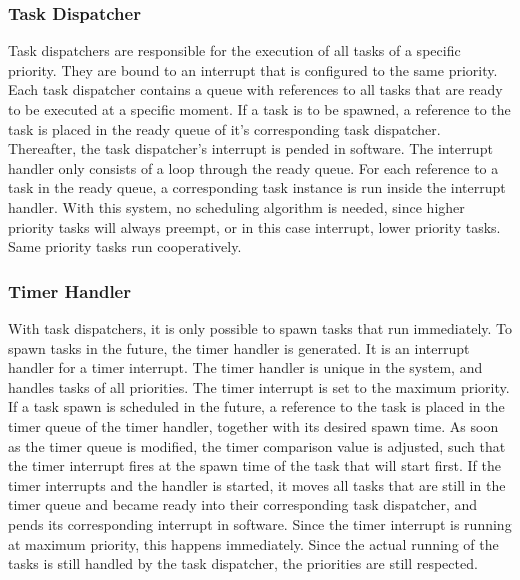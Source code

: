 \subsubsection{Task Dispatcher}
Task dispatchers are responsible for the execution of all tasks of a specific priority.
They are bound to an interrupt that is configured to the same priority.
Each task dispatcher contains a queue with references to all tasks that are ready to be executed at a specific moment.
If a task is to be spawned, a reference to the task is placed in the ready queue of it's corresponding task dispatcher.
Thereafter, the task dispatcher's interrupt is pended in software. The interrupt handler only consists of a loop through the ready queue.
For each reference to a task in the ready queue, a corresponding task instance is run inside the interrupt handler.
With this system, no scheduling algorithm is needed, since higher priority tasks will always preempt, or in this case interrupt, lower priority tasks.
Same priority tasks run cooperatively.

\subsubsection{Timer Handler}
With task dispatchers, it is only possible to spawn tasks that run immediately.
To spawn tasks in the future, the timer handler is generated. It is an interrupt handler for a timer interrupt.
The timer handler is unique in the system, and handles tasks of all priorities.
The timer interrupt is set to the maximum priority.
If a task spawn is scheduled in the future, a reference to the task is placed in the timer queue of the timer handler, together with its desired spawn time.
As soon as the timer queue is modified, the timer comparison value is adjusted, such that the timer interrupt fires at the spawn time of the task that will start first.
If the timer interrupts and the handler is started, it moves all tasks that are still in the timer queue and became ready into their corresponding task dispatcher, and pends its corresponding interrupt in software.
Since the timer interrupt is running at maximum priority, this happens immediately.
Since the actual running of the tasks is still handled by the task dispatcher, the priorities are still respected.

